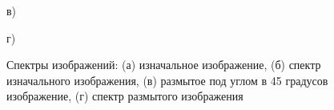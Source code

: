 \begin{figure}[H]
\begin{minipage}[h]{0.4\linewidth}
\end{minipage}
    \vfill
\begin{minipage}[h]{0.4\linewidth}
 в)\\ 
\end{minipage}
    \hfill
\begin{minipage}[h]{0.4\linewidth}
 г)\\
\end{minipage}

\caption{Спектры изображений: (а) изначальное изображение, (б) спектр изначального изображения, (в) размытое под углом в 45 градусов изображение, (г) спектр размытого изображения}
\label{ris:sinc}
\end{figure}


